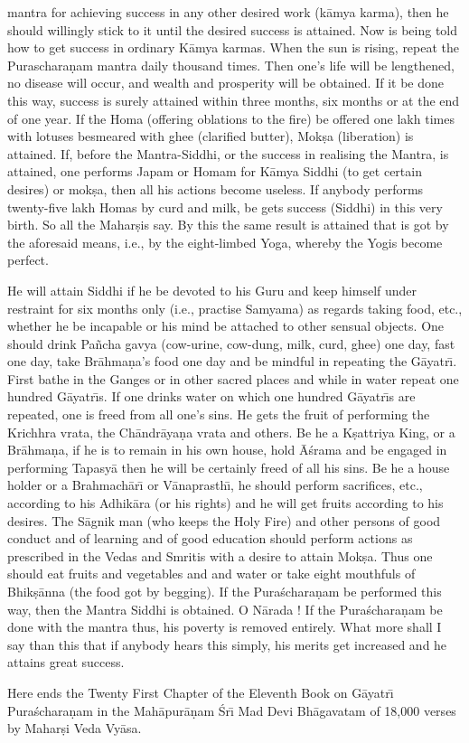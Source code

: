 mantra for achieving success in any other desired work (k\=amya karma), then he should willingly stick to it until the desired success is attained. Now is being told how to get success in ordinary K\=amya karmas. When the sun is rising, repeat the Puraschara\d{n}am mantra daily thousand times. Then one's life will be lengthened, no disease will occur, and wealth and prosperity will be obtained. If it be done this way, success is surely attained within three months, six months or at the end of one year. If the Homa (offering oblations to the fire) be offered one lakh times with lotuses besmeared with ghee (clarified butter), Mok\d{s}a (liberation) is attained. If, before the Mantra-Siddhi, or the success in realising the Mantra, is attained, one performs Japam or Homam for K\=amya Siddhi (to get certain desires) or mok\d{s}a, then all his actions become useless. If anybody performs twenty-five lakh Homas by curd and milk, be gets success (Siddhi) in this very birth. So all the Mahar\d{s}is say. By this the same result is attained that is got by the aforesaid means, i.e., by the eight-limbed Yoga, whereby the Yogis become perfect.

He will attain Siddhi if he be devoted to his Guru and keep himself under restraint for six months only (i.e., practise Samyama) as regards taking food, etc., whether he be incapable or his mind be attached to other sensual objects. One should drink Pa\~ncha gavya (cow-urine, cow-dung, milk, curd, ghee) one day, fast one day, take Br\=ahma\d{n}a's food one day and be mindful in repeating the G\=ayatr\={\i}. First bathe in the Ganges or in other sacred places and while in water repeat one hundred G\=ayatr\={\i}s. If one drinks water on which one hundred G\=ayatr\={\i}s are repeated, one is freed from all one's sins. He gets the fruit of performing the Krichhra vrata, the Ch\=andr\=aya\d{n}a vrata and others. Be he a K\d{s}attriya King, or a Br\=ahma\d{n}a, if he is to remain in his own house, hold \=A\'srama and be engaged in performing Tapasy\=a then he will be certainly freed of all his sins. Be he a house holder or a Brahmach\=ar\={\i} or V\=anaprasth\={\i}, he should perform sacrifices, etc., according to his Adhik\=ara (or his rights) and he will get fruits according to his desires. The S\=agnik man (who keeps the Holy Fire) and other persons of good conduct and of learning and of good education should perform actions as prescribed in the Vedas and Smritis with a desire to attain Mok\d{s}a. Thus one should eat fruits and vegetables and and water or take eight mouthfuls of Bhik\d{s}\=anna (the food got by begging). If the Pura\'schara\d{n}am be performed this way, then the Mantra Siddhi is obtained. O N\=arada ! If the Pura\'schara\d{n}am be done with the mantra thus, his poverty is removed entirely. What more shall I say than this that if anybody hears this simply, his merits get increased and he attains great success.

Here ends the Twenty First Chapter of the Eleventh Book on G\=ayatr\={\i} Pura\'schara\d{n}am in the Mah\=apur\=a\d{n}am \'Sr\={\i} Mad Devi Bh\=agavatam of 18,000 verses by Mahar\d{s}i Veda Vy\=asa.



